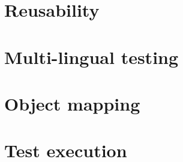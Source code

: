 

\subsection{\gdsteps}


\subsection{\gdcases}


\subsection{\gdsuites}


\subsection{\gdjobs{}}


\subsection{\gdprojects}


\section{Reusability}


\section{Multi-lingual testing}


\section{Object mapping}


\section{Test execution}


